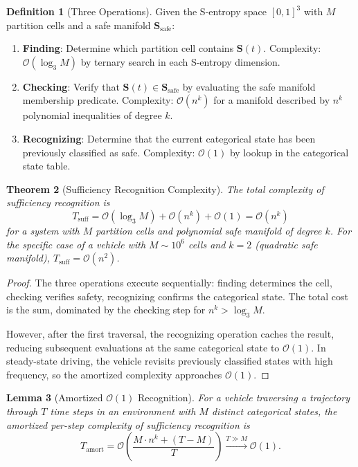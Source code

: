 \documentclass[twocolumn,10pt]{article}
\newtheorem{theorem}{Theorem}[section]
\newtheorem{lemma}[theorem]{Lemma}
\theoremstyle{definition}
\newtheorem{definition}[theorem]{Definition}
\theoremstyle{remark}
\newcommand{\Sent}{\mathbf{S}}
\newcommand{\Ocal}{\mathcal{O}}
\begin{document}
\begin{definition}[Three Operations]\label{def:three-ops}
Given the S-entropy space $[0,1]^3$ with $M$ partition cells and a safe
manifold $\Sent_{\mathrm{safe}}$:
\begin{enumerate}[label=(\roman*)]
  \item \textbf{Finding}: Determine which partition cell contains
    $\Sent(t)$. Complexity: $\Ocal(\log_3 M)$ by ternary search in
    each S-entropy dimension.
  \item \textbf{Checking}: Verify that $\Sent(t) \in \Sent_{\mathrm{safe}}$
    by evaluating the safe manifold membership predicate. Complexity:
    $\Ocal(n^k)$ for a manifold described by $n^k$ polynomial inequalities
    of degree $k$.
  \item \textbf{Recognizing}: Determine that the current categorical state
    has been previously classified as safe. Complexity: $\Ocal(1)$ by
    lookup in the categorical state table.
\end{enumerate}
\end{definition}

\begin{theorem}[Sufficiency Recognition Complexity]\label{thm:recognition-complexity}
The total complexity of sufficiency recognition is
\begin{equation}\label{eq:recognition-complexity}
  T_{\mathrm{suff}} = \Ocal(\log_3 M) + \Ocal(n^k) + \Ocal(1)
  = \Ocal(n^k)
\end{equation}
for a system with $M$ partition cells and polynomial safe manifold of
degree $k$. For the specific case of a vehicle with $M \sim 10^6$ cells
and $k = 2$ (quadratic safe manifold), $T_{\mathrm{suff}} = \Ocal(n^2)$.
\end{theorem}

\begin{proof}
The three operations execute sequentially: finding determines the cell,
checking verifies safety, recognizing confirms the categorical state. The
total cost is the sum, dominated by the checking step for $n^k > \log_3 M$.

However, after the first traversal, the recognizing operation caches the
result, reducing subsequent evaluations at the same categorical state to
$\Ocal(1)$. In steady-state driving, the vehicle revisits previously
classified states with high frequency, so the amortized complexity
approaches $\Ocal(1)$.
\end{proof}

\begin{lemma}[Amortized $\Ocal(1)$ Recognition]\label{lem:amortized}
For a vehicle traversing a trajectory through $T$ time steps in an
environment with $M$ distinct categorical states, the amortized per-step
complexity of sufficiency recognition is
\begin{equation}\label{eq:amortized}
  T_{\mathrm{amort}} = \Ocal\!\left(\frac{M \cdot n^k + (T - M)}{T}\right)
  \xrightarrow{T \gg M} \Ocal(1).
\end{equation}
\end{lemma}
\end{document}
